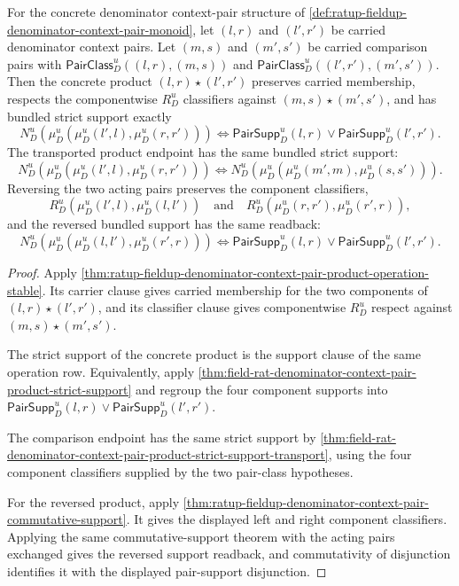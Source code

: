 \begin{theorem}
\label{thm:ratup-fieldup-denominator-context-pair-product-certificate-row}
For the concrete denominator context-pair structure of
\autoref{def:ratup-fieldup-denominator-context-pair-monoid}, let $(l,r)$ and
$(l',r')$ be carried denominator context pairs. Let $(m,s)$ and $(m',s')$ be
carried comparison pairs with
$\mathsf{PairClass}_D^u((l,r),(m,s))$ and
$\mathsf{PairClass}_D^u((l',r'),(m',s'))$. Then the concrete product
$(l,r)\star(l',r')$ preserves carried membership, respects the componentwise
$R_D^u$ classifiers against $(m,s)\star(m',s')$, and has bundled strict support
exactly
$$
N_D^u(\mu_D^u(\mu_D^u(l',l),\mu_D^u(r,r')))
\Longleftrightarrow
\mathsf{PairSupp}_D^u(l,r)\lor\mathsf{PairSupp}_D^u(l',r').
$$
The transported product endpoint has the same bundled strict support:
$$
N_D^u(\mu_D^u(\mu_D^u(l',l),\mu_D^u(r,r')))
\Longleftrightarrow
N_D^u(\mu_D^u(\mu_D^u(m',m),\mu_D^u(s,s'))).
$$
Reversing the two acting pairs preserves the component classifiers,
$$
R_D^u(\mu_D^u(l',l),\mu_D^u(l,l'))\quad\text{and}\quad
R_D^u(\mu_D^u(r,r'),\mu_D^u(r',r)),
$$
and the reversed bundled support has the same readback:
$$
N_D^u(\mu_D^u(\mu_D^u(l,l'),\mu_D^u(r',r)))
\Longleftrightarrow
\mathsf{PairSupp}_D^u(l,r)\lor\mathsf{PairSupp}_D^u(l',r').
$$
\end{theorem}
\begin{proof}
Apply
\autoref{thm:ratup-fieldup-denominator-context-pair-product-operation-stable}.
Its carrier clause gives carried membership for the two components of
$(l,r)\star(l',r')$, and its classifier clause gives componentwise $R_D^u$
respect against $(m,s)\star(m',s')$.

The strict support of the concrete product is the support clause of the same
operation row. Equivalently, apply
\autoref{thm:field-rat-denominator-context-pair-product-strict-support} and
regroup the four component supports into
$\mathsf{PairSupp}_D^u(l,r)\lor\mathsf{PairSupp}_D^u(l',r')$.

The comparison endpoint has the same strict support by
\autoref{thm:field-rat-denominator-context-pair-product-strict-support-transport},
using the four component classifiers supplied by the two pair-class
hypotheses.

For the reversed product, apply
\autoref{thm:ratup-fieldup-denominator-context-pair-commutative-support}. It
gives the displayed left and right component classifiers. Applying the same
commutative-support theorem with the acting pairs exchanged gives the reversed
support readback, and commutativity of disjunction identifies it with the
displayed pair-support disjunction.
\end{proof}
